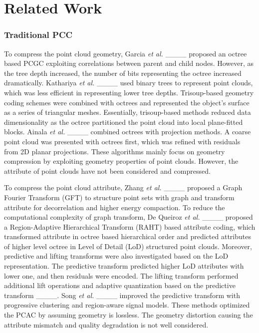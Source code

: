 \section{Related Work}
\subsubsection{Traditional PCC}
To compress the point cloud geometry, Garcia \textit{et al.} ____ proposed {an} octree based PCGC exploiting correlations between parent and child nodes. However, as the tree depth increased, the number of bits representing the octree increased dramatically. Kathariya \textit{et al.} ____ used binary trees to represent point clouds, which was less efficient in representing lower tree depths. Trisoup-based geometry coding schemes were combined with octrees and represented the object's surface as a series of triangular meshes. Essentially, trisoup-based methods reduced data dimensionality as the octree partitioned the point cloud into local plane-fitted blocks. Ainala \textit{et al.} ____ combined octrees with projection methods. A coarse point cloud was presented with octrees first, which was refined with residuals from 2D planar projections. These algorithms mainly focus on geometry compression by exploiting geometry {properties}  of point clouds. However, the attribute of point clouds have not been considered and compressed.
		
To compress the point cloud attribute, Zhang \textit{et al.} ____ proposed a Graph Fourier Transform (GFT) to structure point sets with graph and transform attribute for decorrelation and higher energy compaction. To reduce the computational complexity of graph transform, De Queiroz \textit{et al.} ____ proposed a Region-Adaptive Hierarchical Transform (RAHT) based attribute coding, which transformed attribute in {octree} based hierarchical order and
predicted attributes of higher level octree in Level of Detail (LoD) structured point clouds. Moreover, predictive and lifting transforms were also investigated based on the LoD representation. The predictive transform predicted higher LoD attributes with lower one, and then residuals were encoded. The lifting transform performed additional lift operations and adaptive quantization based on the predictive transform ____. Song \textit{et al.} ____ improved the predictive transform with progressive clustering and region-aware signal models. These methods optimized the PCAC by assuming geometry is lossless. The geometry distortion causing the attribute mismatch and quality degradation is not well considered.
		
